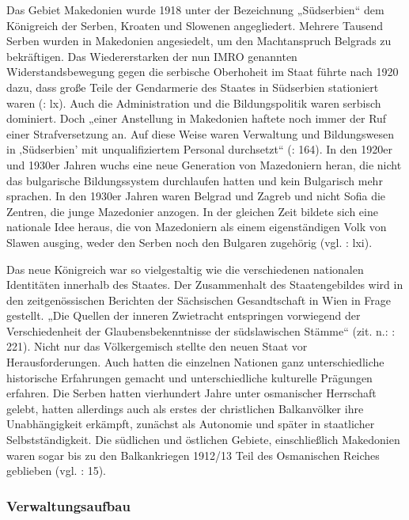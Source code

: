 Das Gebiet Makedonien wurde 1918 unter der Bezeichnung „Südserbien“ dem Königreich der Serben, Kroaten und Slowenen angegliedert. Mehrere Tausend Serben wurden in Makedonien angesiedelt, um den Machtanspruch Belgrads zu bekräftigen. Das Wiedererstarken der nun IMRO genannten Widerstandsbewegung gegen die serbische Oberhoheit im Staat führte nach 1920 dazu, dass große Teile der Gendarmerie des Staates in Südserbien stationiert waren (\cite{bech09}:  lx). Auch die Administration und die Bildungspolitik waren serbisch dominiert. Doch „einer Anstellung in Makedonien haftete noch immer der Ruf einer Strafversetzung an. Auf diese Weise waren Verwaltung und Bildungswesen in ‚Südserbien’ mit unqualifiziertem Personal durchsetzt“ (\cite{opfer}: 164). In den 1920er und 1930er Jahren wuchs eine neue Generation von Mazedoniern heran, die nicht das bulgarische Bildungssystem durchlaufen hatten und kein Bulgarisch mehr sprachen. In den 1930er Jahren waren Belgrad und Zagreb und nicht Sofia die Zentren, die junge Mazedonier anzogen. In der gleichen Zeit bildete sich eine nationale Idee heraus, die von Mazedoniern als einem eigenständigen Volk von Slawen ausging, weder den Serben noch den Bulgaren zugehörig (vgl. \cite{bech09}: lxi).\par

Das neue Königreich war so vielgestaltig wie die verschiedenen nationalen Identitäten innerhalb des Staates. Der Zusammenhalt des Staatengebildes wird in den zeitgenössischen Berichten der Sächsischen Gesandtschaft in Wien in Frage gestellt. „Die Quellen der inneren Zwietracht entspringen vorwiegend der Verschiedenheit der Glaubensbekenntnisse der südslawischen Stämme“ (zit. n.: \cite{opitz}: 221). Nicht nur das Völkergemisch stellte den neuen Staat vor Herausforderungen. Auch hatten die einzelnen Nationen ganz unterschiedliche historische Erfahrungen gemacht und unterschiedliche kulturelle Prägungen erfahren. Die Serben hatten vierhundert Jahre unter osmanischer Herrschaft gelebt, hatten allerdings auch als erstes der christlichen Balkanvölker ihre Unabhängigkeit erkämpft, zunächst als Autonomie und später in staatlicher Selbstständigkeit. Die südlichen und östlichen Gebiete, einschließlich Makedonien waren sogar bis zu den Balkankriegen 1912/13 Teil des Osmanischen Reiches geblieben (vgl. \cite{libal}: 15).
\par

\subsubsection{Verwaltungsaufbau}

